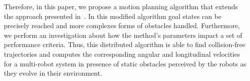 \documentclass[eprint]{actapoly}
\begin{document}
%
%
%
% 
%
%
% 
%
%
% 
%

 


Therefore, in this paper, we propose a motion planning algorithm that extends 
the approach presented in~\cite{Defoort2009}. In this modified algorithm goal states can be precisely reached and more complexes forms of obstacles handled.
Furthermore, we perform an investigation 
about how the method's parameters impact a set of performance criteria.
Thus, this distributed algorithm is able to find collision-free trajectories and 
computes the corresponding angular and longitudinal velocities for a multi-robot system in 
presence of static obstacles perceived by the robots as they evolve in their environment.

\end{document}
